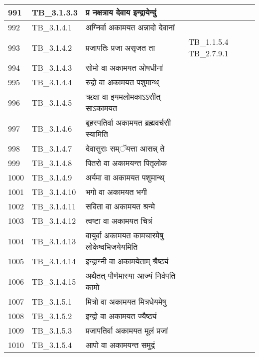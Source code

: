 \documentclass[17pt]{extarticle}
\begin{document}
\begin{longtable}{||p{0.4in}||p{0.9in}||p{4.0in}||p{0.9in}||}
        \hline
            991 & TB\_3.1.3.3 & प्र नक्षत्राय देवाय इन्द्रायेन्दुं &      \\
        \hline
            992 & TB\_3.1.4.1 & अग्निर्वा अकामयत अन्नादो देवानां &      \\
        \hline
            993 & TB\_3.1.4.2 & प्रजापतिः प्रजा असृजत ता & TB\_1.1.5.4 TB\_2.7.9.1        \\
        \hline
            994 & TB\_3.1.4.3 & सोमो वा अकामयत ओषधीनां &      \\
        \hline
            995 & TB\_3.1.4.4 & रुद्रो वा अकामयत पशुमान्थ् &      \\
        \hline
            996 & TB\_3.1.4.5 & ऋक्षा वा इयमलोमकाऽऽसीत् साऽकामयत &      \\
        \hline
            997 & TB\_3.1.4.6 & बृहस्पतिर्वा अकामयत ब्रह्मवर्चसी स्यामिति &      \\
        \hline
            998 & TB\_3.1.4.7 & देवासुराः सम्ॅयत्ता आसन्न् ते &      \\
        \hline
            999 & TB\_3.1.4.8 & पितरो वा अकामयन्त पितृलोक &      \\
        \hline
            1000 & TB\_3.1.4.9 & अर्यमा वा अकामयत पशुमान्थ् &      \\
        \hline
            1001 & TB\_3.1.4.10 & भगो वा अकामयत भगी &      \\
        \hline
            1002 & TB\_3.1.4.11 & सविता वा अकामयत श्रन्मे &      \\
        \hline
            1003 & TB\_3.1.4.12 & त्वष्टा वा अकामयत चित्रं &      \\
        \hline
            1004 & TB\_3.1.4.13 & वायुर्वा अकामयत कामचारमेषु लोकेष्वभिजयेयमिति &      \\
        \hline
            1005 & TB\_3.1.4.14 & इन्द्राग्नी वा अकामयेताम् श्रैष्ठ्यं &      \\
        \hline
            1006 & TB\_3.1.4.15 & अथैतत्{-}पौर्णमास्या आज्यं निर्वपति कामो &      \\
        \hline
            1007 & TB\_3.1.5.1 & मित्रो वा अकामयत मित्रधेयमेषु &      \\
        \hline
            1008 & TB\_3.1.5.2 & इन्द्रो वा अकामयत ज्यैष्ठ्यं &      \\
        \hline
            1009 & TB\_3.1.5.3 & प्रजापतिर्वा अकामयत मूलं प्रजां &      \\
        \hline
            1010 & TB\_3.1.5.4 & आपो वा अकामयन्त समुद्रं &      \\
        \hline

\end{longtable}
\end{document}
